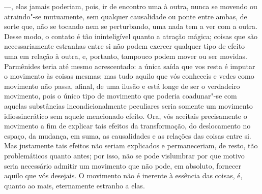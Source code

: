---, elas jamais poderiam, pois, ir de encontro uma à outra, nunca se movendo
    ou atraindo"-se mutuamente, sem qualquer causalidade ou ponte entre
    ambas, de sorte que, não se tocando nem se perturbando, uma nada tem a
    ver com a outra. Desse modo, o contato é tão ininteligível quanto \label{ocontatoe} 
    a atração mágica; coisas que são necessariamente estranhas
    entre si não \label{coisasquesao} podem exercer qualquer tipo de efeito
    uma em relação à outra, e, portanto, tampouco podem mover ou ser movidas.
    Parmênides teria até mesmo acrescentado: a única saída que vos resta é
    imputar o movimento às coisas mesmas; mas tudo aquilo que vós conheceis e
    vedes como movimento não passa, afinal, de uma ilusão e está longe de ser
    o verdadeiro movimento, pois o único tipo de movimento que poderia
    coadunar"-se com aquelas substâncias incondicionalmente peculiares seria
    somente um movimento idiossincrático sem aquele mencionado efeito. Ora,
    vós aceitais precisamente o movimento a fim de explicar tais efeitos da
    transformação, do deslocamento no espaço, da mudança, em suma, as
    causalidades e as relações das coisas entre si. Mas justamente tais
    efeitos não seriam explicados e permaneceriam, de resto, tão
    problemáticos quanto antes; por isso, não se pode vislumbrar por que
    motivo seria necessário admitir um movimento que não pode, em absoluto,
    fornecer aquilo que vós desejais. O movimento não é inerente à essência
    das coisas, é, quanto ao mais, eternamente estranho a elas.

